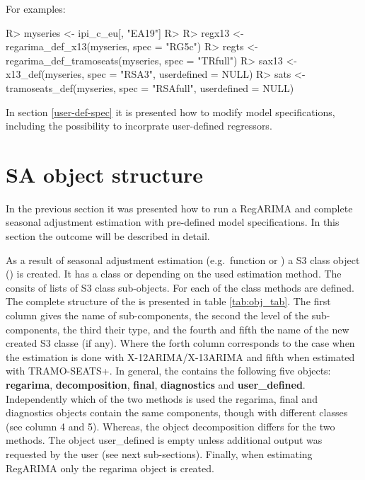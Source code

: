 \documentclass[article]{jss}
\begin{document}
For examples:

\begin{CodeChunk}

\begin{CodeInput}
R> myseries <- ipi_c_eu[, "EA19"]
R> 
R> regx13 <- regarima_def_x13(myseries, spec = "RG5c")
R> regts <- regarima_def_tramoseats(myseries, spec = "TRfull")
R> sax13 <- x13_def(myseries, spec = "RSA3", userdefined = NULL)
R> sats <- tramoseats_def(myseries, spec = "RSAfull", userdefined = NULL)
\end{CodeInput}
\end{CodeChunk}

In section \ref{user-def-spec} it is presented how to modify model
specifications, including the possibility to incorprate user-defined
regressors.

\hypertarget{sa-object-structure}{%
\section{SA object structure}\label{sa-object-structure}}

In the previous section it was presented how to run a RegARIMA and
complete seasonal adjustment estimation with pre-defined model
specifications. In this section the outcome will be described in detail.

As a result of seasonal adjustment estimation (e.g.~function
 or ) a S3 class object
() is created. It has a class  or
 depending on the used estimation method.
The  consits of lists of S3 class sub-objects. For each
of the class  methods are defined. The complete
structure of the  is presented in table
\ref{tab:obj_tab}. The first column gives the name of 
sub-components, the second the level of the sub-components, the third
their type, and the fourth and fifth the name of the new created S3
classe (if any). Where the forth column corresponds to the case when the
estimation is done with X-12ARIMA/X-13ARIMA and fifth when estimated
with TRAMO-SEATS+. In general, the  contains the
following five objects: \textbf{regarima}, \textbf{decomposition},
\textbf{final}, \textbf{diagnostics} and \textbf{user\_defined}.
Independently which of the two methods is used the regarima, final and
diagnostics objects contain the same components, though with different
classes (see column 4 and 5). Whereas, the object decomposition differs
for the two methods. The object user\_defined is empty unless additional
output was requested by the user (see next sub-sections). Finally, when
estimating RegARIMA only the regarima object is created.
\end{document}
